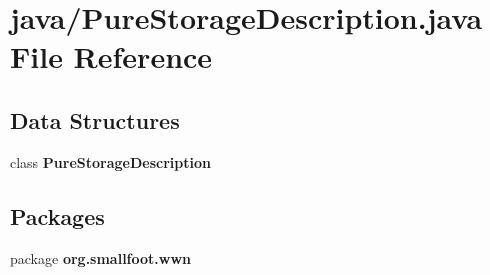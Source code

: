\section{java/\-Pure\-Storage\-Description.java File Reference}
\label{PureStorageDescription_8java}
\subsection*{Data Structures}
\begin{DoxyCompactItemize}
\item 
class {\bf Pure\-Storage\-Description}
\end{DoxyCompactItemize}
\subsection*{Packages}
\begin{DoxyCompactItemize}
\item 
package {\bf org.\-smallfoot.\-wwn}
\end{DoxyCompactItemize}
